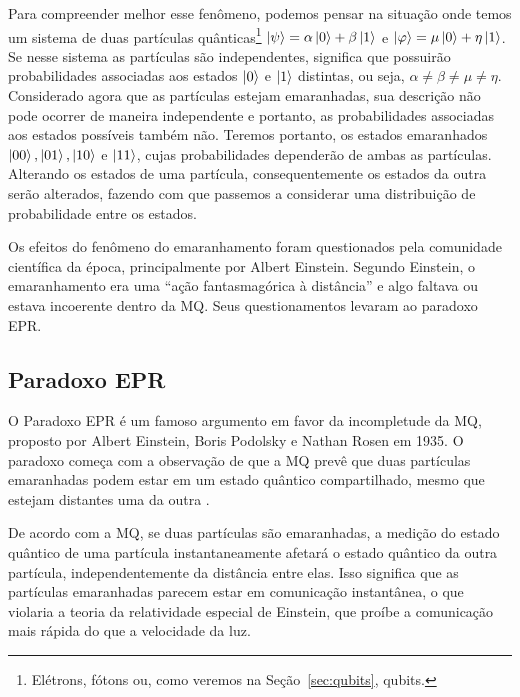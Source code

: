 
Para compreender melhor esse fenômeno, podemos pensar na situação onde temos um sistema de duas partículas quânticas\footnote{Elétrons, fótons ou, como veremos na Seção~\ref{sec:qubits}, qubits.} $\ket{\psi}=\alpha\ket{0}+\beta\ket{1}$ e $\ket{\varphi}=\mu\ket{0}+\eta\ket{1}$. Se nesse sistema as partículas são independentes, significa que possuirão probabilidades associadas aos estados $\ket{0}$ e $\ket{1}$ distintas, ou seja, $\alpha \neq \beta \neq \mu \neq \eta$. Considerado agora que as partículas estejam emaranhadas, sua descrição não pode ocorrer de maneira independente e portanto, as probabilidades associadas aos estados possíveis também não. Teremos portanto, os estados emaranhados $\ket{00}, \ket{01}, \ket{10}$ e $\ket{11}$, cujas probabilidades dependerão de ambas as partículas. Alterando os estados de uma partícula, consequentemente os estados da outra serão alterados, fazendo com que passemos a considerar uma distribuição de probabilidade entre os estados.

Os efeitos do fenômeno do emaranhamento foram questionados pela comunidade científica da época, principalmente por Albert Einstein. Segundo Einstein, o emaranhamento era uma ``ação fantasmagórica à distância'' e algo faltava ou estava incoerente dentro da MQ. Seus questionamentos levaram ao paradoxo EPR.

\subsection{Paradoxo EPR}\label{sec:epr}

O Paradoxo EPR é um famoso argumento em favor da incompletude da MQ, proposto por Albert Einstein, Boris Podolsky e Nathan Rosen em 1935. O paradoxo começa com a observação de que a MQ prevê que duas partículas emaranhadas podem estar em um estado quântico compartilhado, mesmo que estejam distantes uma da outra \cite{epr}.

De acordo com a MQ, se duas partículas são emaranhadas, a medição do estado quântico de uma partícula instantaneamente afetará o estado quântico da outra partícula, independentemente da distância entre elas. Isso significa que as partículas emaranhadas parecem estar em comunicação instantânea, o que violaria a teoria da relatividade especial de Einstein, que proíbe a comunicação mais rápida do que a velocidade da luz.

